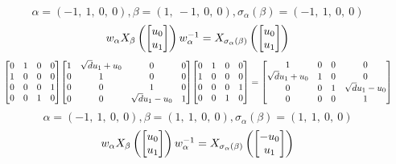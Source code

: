 \documentclass[11pt]{article}
\theoremstyle{definition}
\begin{document}
\[
\alpha = \left( -1, \  1, \  0, \  0\right), \beta = \left( 1, \  -1, \  0, \  0\right), \sigma_{\alpha}(\beta) = \left( -1, \  1, \  0, \  0\right)
\]
\[
\scaletoalign{\textwidth}{w_{\alpha} X_{\beta}\left(\left[\begin{matrix}u_{0}\\u_{1}\end{matrix}\right]\right) w_{\alpha}^{-1} = X_{\sigma_{\alpha}\left(\beta\right)}\left(\left[\begin{matrix}u_{0}\\u_{1}\end{matrix}\right]\right)}
\]
\[
\scaletoalign{\textwidth}{{\left[\begin{matrix}0 & 1 & 0 & 0\\1 & 0 & 0 & 0\\0 & 0 & 0 & 1\\0 & 0 & 1 & 0\end{matrix}\right]} {\left[\begin{matrix}1 & \sqrt{d} u_{1} + u_{0} & 0 & 0\\0 & 1 & 0 & 0\\0 & 0 & 1 & 0\\0 & 0 & \sqrt{d} u_{1} - u_{0} & 1\end{matrix}\right]} {\left[\begin{matrix}0 & 1 & 0 & 0\\1 & 0 & 0 & 0\\0 & 0 & 0 & 1\\0 & 0 & 1 & 0\end{matrix}\right]} = {\left[\begin{matrix}1 & 0 & 0 & 0\\\sqrt{d} u_{1} + u_{0} & 1 & 0 & 0\\0 & 0 & 1 & \sqrt{d} u_{1} - u_{0}\\0 & 0 & 0 & 1\end{matrix}\right]}}
\]
\[
\alpha = \left( -1, \  1, \  0, \  0\right), \beta = \left( 1, \  1, \  0, \  0\right), \sigma_{\alpha}(\beta) = \left( 1, \  1, \  0, \  0\right)
\]
\[
\scaletoalign{\textwidth}{w_{\alpha} X_{\beta}\left(\left[\begin{matrix}u_{0}\\u_{1}\end{matrix}\right]\right) w_{\alpha}^{-1} = X_{\sigma_{\alpha}\left(\beta\right)}\left(\left[\begin{matrix}- u_{0}\\u_{1}\end{matrix}\right]\right)}
\]
\end{document}
